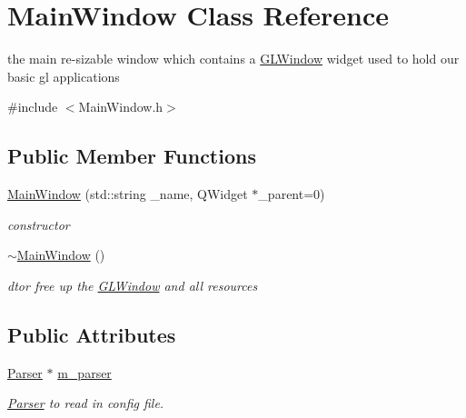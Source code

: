 \hypertarget{classMainWindow}{
\section{MainWindow Class Reference}
\label{classMainWindow}
}


the main re-\/sizable window which contains a \hyperlink{classGLWindow}{GLWindow} widget used to hold our basic gl applications  


{\ttfamily \#include $<$MainWindow.h$>$}\subsection*{Public Member Functions}
\begin{DoxyCompactItemize}
\item 
\hyperlink{classMainWindow_a46c320729b0e05c9fbb29bc3a0378aed}{MainWindow} (std::string \_\-name, QWidget $\ast$\_\-parent=0)
\begin{DoxyCompactList}\small\item\em constructor \item\end{DoxyCompactList}\item 
\hyperlink{classMainWindow_ae98d00a93bc118200eeef9f9bba1dba7}{$\sim$MainWindow} ()
\begin{DoxyCompactList}\small\item\em dtor free up the \hyperlink{classGLWindow}{GLWindow} and all resources \item\end{DoxyCompactList}\end{DoxyCompactItemize}
\subsection*{Public Attributes}
\begin{DoxyCompactItemize}
\item 
\hyperlink{classParser}{Parser} $\ast$ \hyperlink{classMainWindow_ada47ec5452a8928b731bf7167e6d69dc}{m\_\-parser}
\begin{DoxyCompactList}\small\item\em \hyperlink{classParser}{Parser} to read in config file. \item\end{DoxyCompactList}\end{DoxyCompactItemize}
